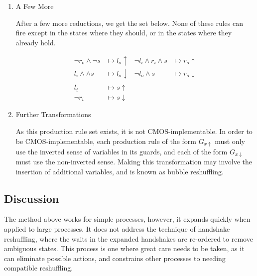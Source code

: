 \documentclass[times,10pt]{article}
\begin{document}
\begin{enumerate}
\item A Few More

After a few more reductions, we get the set below.  None of these rules can fire except in the states where they should, or in the states where they already hold.




\begin{align*}
\lnot r_o \wedge \lnot s & \mapsto l_o \uparrow & \lnot l_i \wedge r_i \wedge s  & \mapsto r_o \uparrow \\
l_i \wedge \wedge s & \mapsto l_o \downarrow  & \lnot l_o \wedge s & \mapsto r_o\downarrow \\ \\
l_i & \mapsto s\uparrow & & \\
\lnot r_i & \mapsto s\downarrow & & 
\end{align*}


\item Further Transformations

As this production rule set exists, it is not CMOS-implementable.  In order to be CMOS-implementable, each production rule of the form $G_{x\uparrow}$ must only use the inverted sense of variables in its guards, and each of the form $G_{x\downarrow}$ must use the non-inverted sense.  Making this transformation may involve the insertion of additional variables, and is known as bubble reshuffling. 

\end{enumerate}

\subsection{Discussion}

The method above works for simple processes, however, it expands quickly when applied to large processes.  It does not address the technique of handshake reshuffling, where the waits in the expanded handshakes are re-ordered to remove ambiguous states.  This process is one where great care needs to be taken, as it can eliminate possible actions, and constrains other processes to needing compatible reshuffling.

\end{document}
